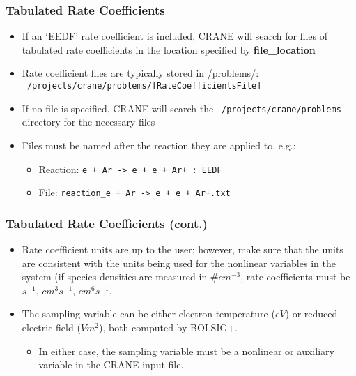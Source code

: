 	\begin{frame}[fragile]
	\frametitle{Tabulated Rate Coefficients}
	\begin{itemize}
		\item If an `EEDF' rate coefficient is included, CRANE will search for files of tabulated rate coefficients in the location specified by \textbf{file\_location}
		\item Rate coefficient files are typically stored in /problems/: \texttt{~/projects/crane/problems/[RateCoefficientsFile]}
		\item If no file is specified, CRANE will search the \texttt{~/projects/crane/problems} directory for the necessary files
		\item Files must be named after the reaction they are applied to, e.g.:
		\begin{itemize}
			\item {\scriptsize Reaction: \texttt{e + Ar -> e + e + Ar+   : EEDF}}
			\item {\scriptsize File: \texttt{reaction\_e + Ar -> e + e + Ar+.txt}}
		\end{itemize}
	\end{itemize}
	\end{frame}
	
	\begin{frame}[fragile]
	\frametitle{Tabulated Rate Coefficients (cont.)}
	\begin{itemize}
		\item Rate coefficient units are up to the user; however, make sure that the units are consistent with the units being used for the nonlinear variables in the system (if species densities are measured in $\# cm^{-3}$, rate coefficients must be $s^{-1}$, $cm^3 s^{-1}$, $cm^6 s^{-1}$.
		\item The sampling variable can be either electron temperature ($eV$) or reduced electric field ($V m^2$), both computed by BOLSIG+. 
		\begin{itemize}
			\item In either case, the sampling variable must be a nonlinear or auxiliary variable in the CRANE input file. 
		\end{itemize}
	\end{itemize}
	\end{frame}

